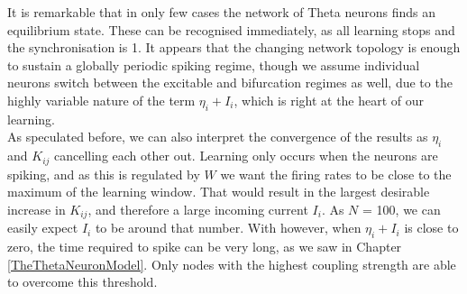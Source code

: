 It is remarkable that in only few cases the network of Theta neurons finds an equilibrium state. These can be recognised immediately, as all learning stops and the synchronisation is 1. It appears that the changing network topology is enough to sustain a globally periodic spiking regime, though we assume individual neurons switch between the excitable and bifurcation regimes as well, due to the highly variable nature of the term $\eta_i + I_i$, which is right at the heart of our learning. \\

As speculated before, we can also interpret the convergence of the results as $\eta_i$ and $K_{ij}$ cancelling each other out. Learning only occurs when the neurons are spiking, and as this is regulated by $W$ we want the firing rates to be close to the maximum of the learning window. That would result in the largest desirable increase in $K_{ij}$, and therefore a large incoming current $I_i$. As $N$ = 100, we can easily expect $I_i$ to be around that number. With \IP however, when $\eta_i + I_i$ is close to zero, the time required to spike can be very long, as we saw in Chapter \ref{TheThetaNeuronModel}. Only nodes with the highest coupling strength are able to overcome this threshold.

